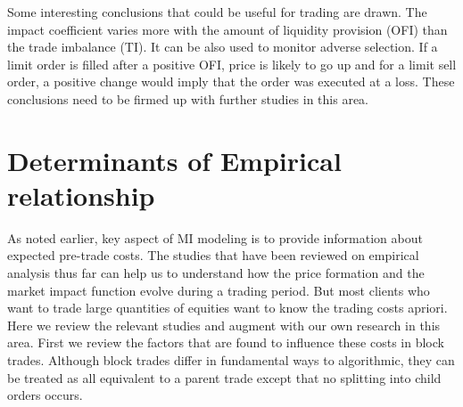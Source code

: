 Some interesting conclusions that could be useful for trading are drawn. The impact coefficient varies more with the amount of liquidity provision (OFI) than the trade imbalance (TI). It can be also used to monitor adverse selection. If a limit order is filled after a positive OFI, price is likely to go up and for a limit sell order, a positive change would imply that the order was executed at a loss. These conclusions need to be firmed up with further studies in this area.



\section{Determinants of Empirical relationship}

 As noted earlier, key aspect of MI modeling is to provide information about expected pre-trade costs. The studies that have been reviewed on empirical analysis thus far can help us to understand how the price formation and the market impact function evolve during a trading period. But most clients who want to trade large quantities of equities want to know the trading costs apriori. Here we review the relevant studies and augment with our own research in this area. First we review the factors that are found to influence these costs in block trades. Although block trades differ in fundamental ways to algorithmic, they can be treated as all equivalent to a parent trade except that no splitting into child orders occurs.


